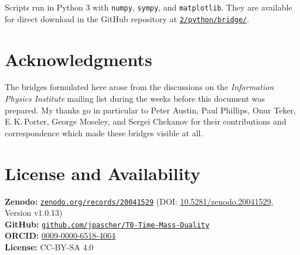 Scripts run in Python 3 with \texttt{numpy}, \texttt{sympy}, and \texttt{matplotlib}. They are available for direct download in the GitHub repository at \href{https://github.com/jpascher/T0-Time-Mass-Duality/tree/main/2/python/bridge}{\texttt{2/python/bridge/}}.

\section*{Acknowledgments}

The bridges formulated here arose from the discussions on the \emph{Information Physics Institute} mailing list during the weeks before this document was prepared. My thanks go in particular to Peter Austin, Paul Phillips, Onur Teker, E.\,K.\,Porter, George Moseley, and Sergei Chekanov for their contributions and correspondence which made these bridges visible at all.

\section*{License and Availability}

\textbf{Zenodo:} \href{https://zenodo.org/records/20041529}{\texttt{zenodo.org/records/20041529}} (DOI: \href{https://doi.org/10.5281/zenodo.20041529}{10.5281/zenodo.20041529}, Version v1.0.13)\\
\textbf{GitHub:} \href{https://github.com/jpascher/T0-Time-Mass-Duality}{\texttt{github.com/jpascher/T0-Time-Mass-Duality}}\\
\textbf{ORCID:} \href{https://orcid.org/0009-0000-6518-4064}{0009-0000-6518-4064}\\
\textbf{License:} CC-BY-SA 4.0

